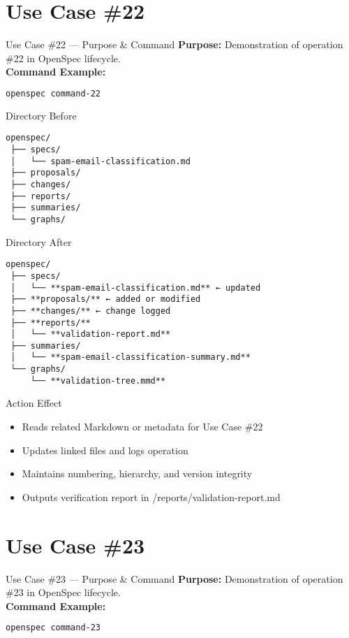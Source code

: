 \documentclass[aspectratio=169]{beamer}
\begin{document}
\section*{Use Case \#22}
\begin{frame}{Use Case \#22 --- Purpose \& Command}
\textbf{Purpose:} Demonstration of operation \#22 in OpenSpec lifecycle.\\[4pt]
\textbf{Command Example:}
\begin{lstlisting}[language=bash]
openspec command-22
\end{lstlisting}
\end{frame}

\begin{frame}{Directory Before}
\begin{lstlisting}
openspec/
 ├── specs/
 │   └── spam-email-classification.md
 ├── proposals/
 ├── changes/
 ├── reports/
 ├── summaries/
 └── graphs/
\end{lstlisting}
\end{frame}

\begin{frame}{Directory After}
\begin{lstlisting}
openspec/
 ├── specs/
 │   └── **spam-email-classification.md** ← updated
 ├── **proposals/** ← added or modified
 ├── **changes/** ← change logged
 ├── **reports/**
 │   └── **validation-report.md**
 ├── summaries/
 │   └── **spam-email-classification-summary.md**
 └── graphs/
     └── **validation-tree.mmd**
\end{lstlisting}
\end{frame}

\begin{frame}{Action Effect}
\begin{itemize}
  \item Reads related Markdown or metadata for Use Case \#22
  \item Updates linked files and logs operation
  \item Maintains numbering, hierarchy, and version integrity
  \item Outputs verification report in /reports/validation-report.md
\end{itemize}
\end{frame}

\section*{Use Case \#23}
\begin{frame}{Use Case \#23 --- Purpose \& Command}
\textbf{Purpose:} Demonstration of operation \#23 in OpenSpec lifecycle.\\[4pt]
\textbf{Command Example:}
\begin{lstlisting}[language=bash]
openspec command-23
\end{lstlisting}
\end{frame}
\end{document}
